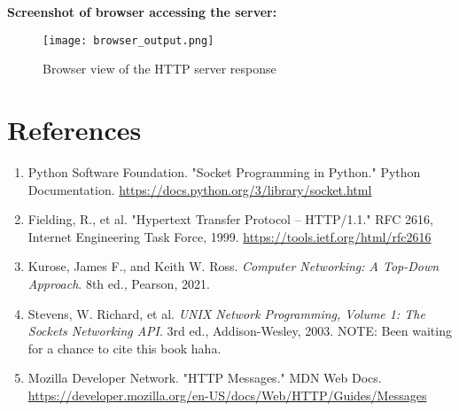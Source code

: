\documentclass[12pt]{article}
\begin{document}
\textbf{Screenshot of browser accessing the server:}

\begin{figure}[H]
    \centering
    \texttt{[image: browser\_output.png]}
    \caption{Browser view of the HTTP server response}
    \label{fig:server_browser}
\end{figure}

\section{References}

\begin{enumerate}
    \item Python Software Foundation. "Socket Programming in Python." Python Documentation. \url{https://docs.python.org/3/library/socket.html}
    \item Fielding, R., et al. "Hypertext Transfer Protocol -- HTTP/1.1." RFC 2616, Internet Engineering Task Force, 1999. \url{https://tools.ietf.org/html/rfc2616}
    \item Kurose, James F., and Keith W. Ross. \textit{Computer Networking: A Top-Down Approach}. 8th ed., Pearson, 2021.
    \item Stevens, W. Richard, et al. \textit{UNIX Network Programming, Volume 1: The Sockets Networking API}. 3rd ed., Addison-Wesley, 2003. NOTE: Been waiting for a chance to cite this book haha.
    \item Mozilla Developer Network. "HTTP Messages." MDN Web Docs. \url{https://developer.mozilla.org/en-US/docs/Web/HTTP/Guides/Messages}
\end{enumerate}
\end{document}
